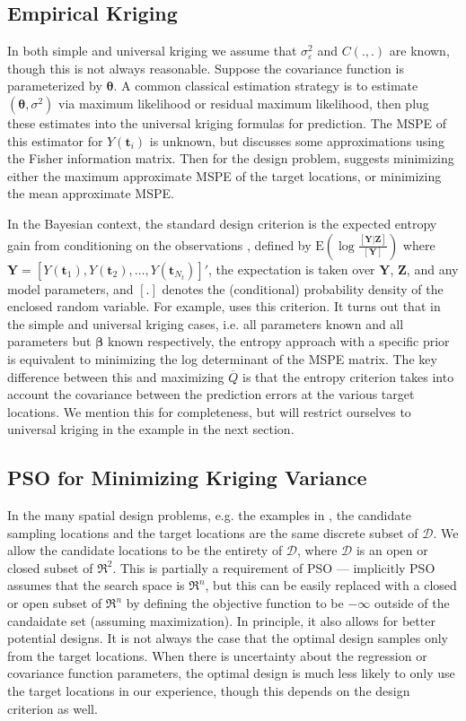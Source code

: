 \documentclass[12pt]{article}
\begin{document}
\subsection{Empirical Kriging}
In both simple and universal kriging we assume that $\sigma^2_{\varepsilon}$ and $C(.,.)$ are known, though this is not always reasonable. Suppose the covariance function is parameterized by $\bm{\theta}$. A common classical estimation strategy is to estimate $(\bm{\theta}, \sigma^2)$ via maximum likelihood or residual maximum likelihood, then plug these estimates into the universal kriging formulas for prediction. The MSPE of this estimator for $Y(\bm{t}_i)$ is unknown, but \cite{zimmerman2006optimal} discusses some approximations using the Fisher information matrix. Then for the design problem, \cite{zimmerman2006optimal} suggests minimizing either the maximum approximate MSPE of the target locations, or minimizing the mean approximate MSPE.

In the Bayesian context, the standard design criterion is the expected entropy gain from conditioning on the observations \citep{ebrahimi2010information}, defined by $\mathrm{E}\left(\log \frac{[\bm{Y}|\bm{Z}]}{[\bm{Y}]}\right)$ where $\bm{Y}=[Y(\bm{t}_1), Y(\bm{t}_2), \dots, Y(\bm{t}_{N_t})]'$, the expectation is taken over $\bm{Y}$, $\bm{Z}$, and any model parameters, and $[.]$ denotes the (conditional) probability density of the enclosed random variable. For example, \cite{fuentes2007bayesian} uses this criterion. It turns out that in the simple and universal kriging cases, i.e. all parameters known and all parameters but $\bm{\beta}$ known respectively, the entropy approach with a specific prior is equivalent to minimizing the log determinant of the MSPE matrix. The key difference between this and maximizing $\overline{Q}$ is that the entropy criterion takes into account the covariance between the prediction errors at the various target locations. We mention this for completeness, but will restrict ourselves to universal kriging in the example in the next section.

\subsection{PSO for Minimizing Kriging Variance}
In the many spatial design problems, e.g. the examples in \cite{zimmerman2006optimal}, the candidate sampling locations and the target locations are the same discrete subset of $\mathcal{D}$. We allow the candidate locations to be the entirety of $\mathcal{D}$, where $\mathcal{D}$ is an open or closed subset of $\Re^2$. This is partially a requirement of PSO --- implicitly PSO assumes that the search space is $\Re^n$, but this can be easily replaced with a closed or open subset of $\Re^n$ by defining the objective function to be $-\infty$ outside of the candaidate set (assuming maximization). In principle, it also allows for better potential designs. It is not always the case that the optimal design samples only from the target locations. When there is uncertainty about the regression or covariance function parameters, the optimal design is much less likely to only use the target locations in our experience, though this depends on the design criterion as well.
\end{document}

